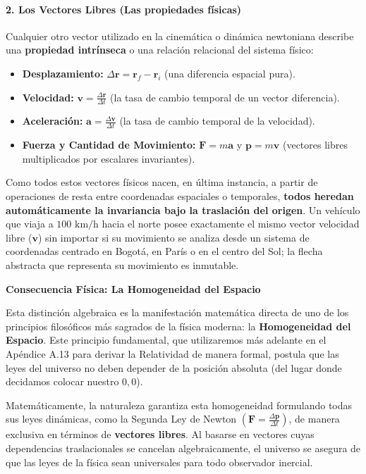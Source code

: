 \documentclass[11pt,a4paper]{book}
\begin{document}
\paragraph{2. Los Vectores Libres (Las propiedades físicas)}
Cualquier otro vector utilizado en la cinemática o dinámica newtoniana describe una \textbf{propiedad intrínseca} o una relación relacional del sistema físico:
\begin{itemize}
    \item \textbf{Desplazamiento:} $\Delta\boldsymbol{r} = \boldsymbol{r}_f - \boldsymbol{r}_i$ (una diferencia espacial pura).
    \item \textbf{Velocidad:} $\boldsymbol{v} = \frac{\Delta\boldsymbol{r}}{\Delta t}$ (la tasa de cambio temporal de un vector diferencia).
    \item \textbf{Aceleración:} $\boldsymbol{a} = \frac{\Delta\boldsymbol{v}}{\Delta t}$ (la tasa de cambio temporal de la velocidad).
    \item \textbf{Fuerza y Cantidad de Movimiento:} $\boldsymbol{F} = m\boldsymbol{a}$ y $\boldsymbol{p} = m\boldsymbol{v}$ (vectores libres multiplicados por escalares invariantes).
\end{itemize}

Como todos estos vectores físicos nacen, en última instancia, a partir de operaciones de resta entre coordenadas espaciales o temporales, \textbf{todos heredan automáticamente la invariancia bajo la traslación del origen}. Un vehículo que viaja a $100 \text{ km/h}$ hacia el norte posee exactamente el mismo vector velocidad libre ($\boldsymbol{v}$) sin importar si su movimiento se analiza desde un sistema de coordenadas centrado en Bogotá, en París o en el centro del Sol; la flecha abstracta que representa su movimiento es inmutable.

\textbf{Consecuencia Física: La Homogeneidad del Espacio}

Esta distinción algebraica es la manifestación matemática directa de uno de los principios filosóficos más sagrados de la física moderna: la \textbf{Homogeneidad del Espacio}. Este principio fundamental, que utilizaremos más adelante en el Apéndice A.13 para derivar la Relatividad de manera formal, postula que las leyes del universo no deben depender de la posición absoluta (del lugar donde decidamos colocar nuestro $0,0$). 

Matemáticamente, la naturaleza garantiza esta homogeneidad formulando todas sus leyes dinámicas, como la Segunda Ley de Newton $\left(\boldsymbol{F} = \frac{\Delta\boldsymbol{p}}{\Delta t}\right)$, de manera exclusiva en términos de \textbf{vectores libres}. Al basarse en vectores cuyas dependencias traslacionales se cancelan algebraicamente, el universo se asegura de que las leyes de la física sean universales para todo observador inercial.
\end{document}
